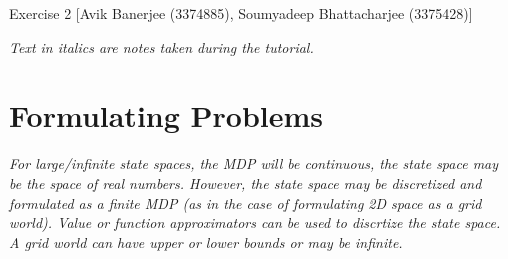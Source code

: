 \documentclass{article}
\begin{document}
\begin{center}
	{\LARGE Exercise 2}\linebreak
	{\large [Avik Banerjee (3374885), Soumyadeep Bhattacharjee (3375428)]}
\end{center}
\textit{Text in italics are notes taken during the tutorial.}
\section{Formulating Problems}
\textit{For large/infinite state spaces, the MDP will be continuous, the state space may be the space of real numbers. However, the state space may be discretized and formulated as a finite MDP (as in the case of formulating 2D space as a grid world). Value or function approximators can be used to discrtize the state space. A grid world can have upper or lower bounds or may be infinite.}
\end{document}
